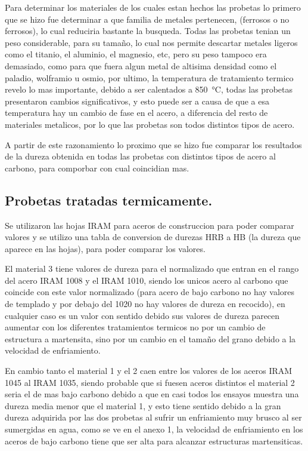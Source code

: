 \documentclass[12pt,a4paper]{article}
\begin{document}
Para determinar los materiales de los cuales estan hechos las probetas lo primero que se hizo fue determinar a que familia de metales pertenecen, (ferrosos o no ferrosos), lo cual reduciria bastante la busqueda. Todas las probetas tenian un peso considerable, para su tamaño, lo cual nos permite descartar metales ligeros como el titanio, el aluminio, el magnesio, etc, pero su peso tampoco era demasiado, como para que fuera algun metal de altisima densidad como el paladio, wolframio u osmio, por ultimo, la temperatura de tratamiento termico revelo lo mas importante, debido a ser calentados a \SI{850}{\degreeCelsius}, todas las probetas presentaron cambios significativos, y esto puede ser a causa de que a esa temperatura hay un cambio de fase en el acero, a diferencia del resto de materiales metalicos, por lo que las probetas son todos distintos tipos de acero.

A partir de este razonamiento lo proximo que se hizo fue comparar los resultados de la dureza obtenida en todas las probetas con distintos tipos de acero al carbono, para comporbar con cual coincidian mas.

\subsection{Probetas tratadas termicamente.}

Se utilizaron las hojas IRAM para aceros de construccion para poder comparar valores y se utilizo una tabla de conversion de durezas HRB a HB (la dureza que aparece en las hojas), para poder comparar los valores. 

El material 3 tiene valores de dureza para el normalizado que entran en el rango del acero IRAM 1008 y el IRAM 1010, siendo los unicos acero al carbono que coincide con este valor normalizado (para acero de bajo carbono no hay valores de templado y por debajo del 1020 no hay valores de dureza en recocido), en cualquier caso es un valor con sentido debido sus valores de dureza parecen aumentar con los diferentes tratamientos termicos no por un cambio de estructura a martensita, sino por un cambio en el tamaño del grano debido a la velocidad de enfriamiento.

En cambio tanto el material 1 y el 2 caen entre los valores de los aceros IRAM 1045 al IRAM 1035, siendo probable que si fuesen aceros distintos el material 2 seria el de mas bajo carbono debido a que en casi todos los ensayos muestra una dureza media menor que el material 1, y esto tiene sentido debido a la gran dureza adquirida por las dos probetas al sufrir un enfriamiento muy brusco al ser sumergidas en agua, como se ve en el anexo 1, la velocidad de enfriamiento en los aceros de bajo carbono tiene que ser alta para alcanzar estructuras martensiticas.
\end{document}
